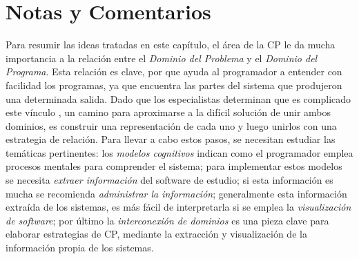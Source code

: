 

\pagebreak
\section{Notas y Comentarios}

Para resumir las ideas tratadas en este capítulo, el área de la CP le da mucha importancia a la relación entre el \textit{Dominio del Problema} y el \textit{Dominio del Programa}. Esta relación es clave, por que ayuda al programador a entender con facilidad los programas, ya que encuentra las partes del sistema que produjeron una determinada salida. Dado que los especialistas determinan que es complicado este vínculo \cite{AMPM11,MPMR07,MBPHRU10,DWE04}, un camino para aproximarse a la difícil solución de unir ambos dominios, es construir una representación de cada uno y luego unirlos con una estrategia de relación. Para llevar a cabo estos pasos, se necesitan estudiar las temáticas pertinentes: los \textit{modelos cognitivos}
indican como el programador emplea procesos mentales para comprender el sistema; para implementar estos modelos se necesita \textit{extraer información} del software de estudio; si esta información es mucha se recomienda \textit{administrar la información}; generalmente esta información extraída de los sistemas, es más fácil de interpretarla si se emplea la \textit{visualización de software}; por último la \textit{interconexión de dominios} es una pieza clave para elaborar estrategias de CP, mediante la extracción y visualización de la información propia de los sistemas.


